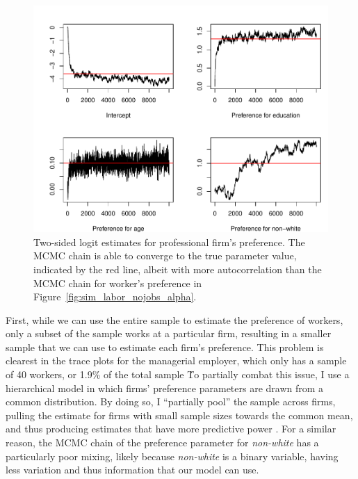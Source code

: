 \begin{figure}[tbp]
  \centering
  \includegraphics[width=\textwidth,keepaspectratio]{../figure/sim_labor_nojobs_beta_emp2}
  \caption[Simulation, estimates for professional firm's preference.]{Two-sided
    logit estimates for professional firm's preference. The MCMC chain is able
    to converge to the true parameter value, indicated by the red line, albeit
    with more autocorrelation than the MCMC chain for worker's preference in
    Figure~\ref{fig:sim_labor_nojobs_alpha}.}
  \label{fig:sim_labor_nojobs_beta_emp2}
\end{figure}

First, while we can use the entire sample to estimate the preference of workers,
only a subset of the sample works at a particular firm, resulting in a smaller
sample that we can use to estimate each firm's preference. This problem is
clearest in the trace plots for the managerial employer, which only has a sample
of 40 workers, or 1.9\% of the total sample \. To partially combat this issue, I
use a hierarchical model in which firms' preference parameters are drawn from a
common distribution. By doing so, I ``partially pool'' the sample across firms,
pulling the estimate for firms with small sample sizes towards the common mean,
and thus producing estimates that have more predictive power \citep{Gelman2006}.
For a similar reason, the MCMC chain of the preference parameter for
\textit{non-white} has a particularly poor mixing, likely because
\textit{non-white} is a binary variable, having less variation and thus
information that our model can use.

